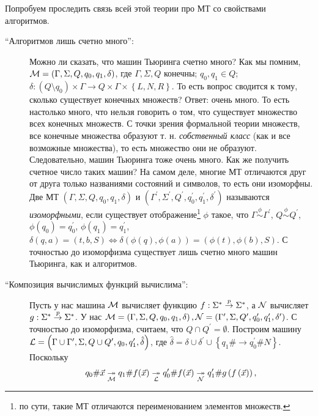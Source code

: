 Попробуем проследить связь всей этой теории про МТ со свойствами алгоритмов.
\begin{description}
    \item[\enquote{Алгоритмов лишь счетно много}:] Можно ли сказать, что машин Тьюринга счетно много?
    Как мы помним, $\mathcal{M} = \left(\Gamma, \Sigma, Q, q_{0}, q_{1}, \delta\right)$, где $\Gamma, \Sigma, Q$ конечны; $q_{0}, q_{1} \in Q$; $\delta: \left(Q \setminus q_{0}\right)  \times \Gamma \to Q \times \Gamma \times \left\{L, N, R\right\}$.
    То есть вопрос сводится к тому, сколько существует конечных множеств?
    Ответ: очень много.
    То есть настолько много, что нельзя говорить о том, что существует множество всех конечных множеств.
    С точки зрения формальной теории множеств, все конечные множества образуют т. н. {\it собственный класс} (как и все возможные множества), то есть множество они не образуют.
    Следовательно, машин Тьюринга тоже очень много.
    Как же получить счетное число таких машин?
    На самом деле, многие МТ отличаются друг от  друга только названиями состояний и символов, то есть они изоморфны.
    Две МТ $\left(\Gamma, \Sigma, Q, q_{0}, q_{1}, \delta\right)$ и $\left(\Gamma^{\prime}, \Sigma^{\prime}, Q^{\prime}, q_{0}^{\prime}, q_{1}^{\prime}, \delta^{\prime}\right)$ называются {\it изоморфными}, если существует отображение\footnote{по сути, такие МТ отличаются переименованием элементов множеств.} $\phi$ такое, что $\Gamma \overset{\phi}{\sim} \Gamma^{\prime}$, $Q \overset{\phi}{\sim} Q^{\prime}$, $\phi\left(q_{0}\right) = q_{0}^{\prime}$, $\phi\left(q_{1}\right) = q_{1}^{\prime}$, $\delta(q, a) = (t, b,  S) \iff \delta(\phi(q), \phi(a)) = (\phi(t), \phi(b), S)$.
    С точностью до изоморфизма существует лишь счетно много машин Тьюринга, как и алгоритмов.
    \item[\enquote{Композиция вычислимых функций вычислима}:] Пусть у нас машина $\mathcal{M}$ вычисляет функцию $f: \Sigma^{*} \overset{p}{\to} \Sigma^{*}$, а $\mathcal{N}$ вычисляет $g: \Sigma^{*} \overset{p}{\to} \Sigma^{*}$.
    У нас $\mathcal{M} = \left(\Gamma, \Sigma, Q, q_{0}, q_{1}, \delta\right), \mathcal{N} = \left(\Gamma^{\prime}, \Sigma, Q^{\prime}, q_{0}^{\prime}, q_{1}^{\prime}, \delta^{\prime}\right)$.
    С точностью до изоморфизма, считаем, что $Q \cap Q^{\prime} = \emptyset$.
    Построим машину $\mathcal{L} = \left(\Gamma \cup \Gamma^{\prime}, \Sigma, Q \cup Q^{\prime}, q_{0}, q_{1}^{\prime}, \hat{\delta}\right)$, где $\hat{\delta} = \delta \cup \delta^{\prime} \cup \left\{q_{1} \# \to q_{0}^{\prime} \# N\right\}$.
    Поскольку
    $$
        q_{0}\#\vec{x} \underset{\mathcal{M}}{\twoheadrightarrow} q_{1}\# f(\vec{x}) \underset{\mathcal{L}}{\twoheadrightarrow}  q_{0}^{\prime} \# f(\vec{x}) \underset{\mathcal{N}}{\twoheadrightarrow} q_{1}^{\prime} \# g\left(f\left(\vec{x}\right)\right),
$$
\end{description}
